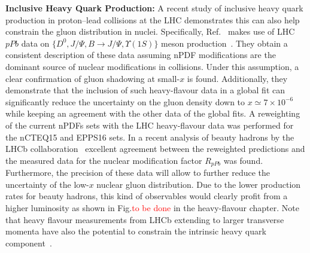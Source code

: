 \documentclass[../report.tex]{subfiles}
\begin{document}
\noindent\textbf{Inclusive Heavy Quark Production:} 
%
A recent study of  inclusive heavy quark
production in proton--lead collisions at the LHC 
demonstrates this can also help constrain  the gluon distribution in nuclei.
%
Specifically, Ref.~\cite{Kusina:2018pbp} makes use  of LHC $pPb$ data on 
$\{D^0, J/\Psi, B\to J/\Psi, \Upsilon(1S)  \}$ meson production~\cite{Abelev:2014hha,Adam:2016ich,Aaij:2017gcy,Adam:2015iga,Aaboud:2017cif,Abelev:2013yxa,Aaij:2013zxa,Aaij:2017cqq,LHCb:2018jln,Abelev:2014oea,TheATLAScollaboration:2015zdl,Aaij:2014mza,ATLAS:2017dgr,Sirunyan:2018sav,Sirunyan:2018pse,Aaij:2018ogq,Aaij:2018iyy}.
%
They obtain a consistent description of these data assuming nPDF
modifications are the dominant source of nuclear modifications in \pPb
collisions. Under this assumption, a clear confirmation of gluon
shadowing at small-$x$ is found.  Additionally, they demonstrate that
the inclusion of such heavy-flavour data in a global fit can
significantly reduce the uncertainty on the gluon density down to
$x\simeq 7 \times 10^{-6}$ while keeping an agreement with the other
data of the global fits.  A reweighting of the current nPDFs sets with
the LHC heavy-flavour data was performed for the nCTEQ15 and EPPS16
sets.  In a recent analysis of beauty hadrons by the LHCb
collaboration~\cite{Aaij:2013zxa,Aaij:2017cqq,LHCb:2018jln} excellent agreement between the reweighted
predictions and the measured data for the nuclear modification factor
$R_{pPb}$ was found. Furthermore, the precision of these data will
allow to further reduce the uncertainty of the low-$x$ nuclear gluon
distribution. Due to the lower production rates for beauty hadrons,
this kind of observables would clearly profit from a higher
luminosity as shown in Fig.\textcolor{red}{to be done} in the heavy-flavour chapter.  Note that heavy flavour measurements from LHCb extending
to larger transverse momenta have also the potential to constrain the
intrinsic heavy quark component~\cite{Kniehl:2009ar,Brodsky:2015fna,Lyonnet:2015dca}.
%
\end{document}
